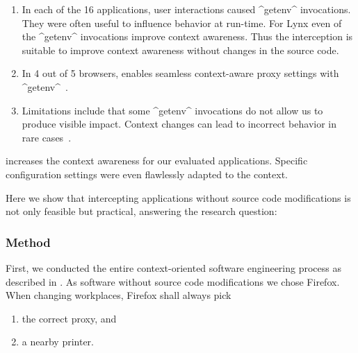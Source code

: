 \begin{finding}
\fixtheorem
\begin{enumerate}
\item In each of the 16 applications, user interactions caused ^getenv^ invocations.
They were often useful to influence behavior at run-time.
For Lynx even  of the ^getenv^ invocations improve context awareness.
Thus the interception is suitable to improve context awareness without changes in the source code.
\item In 4 out of 5 browsers, \elektra{} enables seamless context-aware proxy settings with ^getenv^~\cite{raab2017introducing}.


\item
Limitations include that some ^getenv^ invocations do not allow us to produce visible impact.
Context changes can lead to incorrect behavior in rare cases~\cite{raab2016unanticipated}.
\end{enumerate}

\begin{implication}
\elektra{} increases the context awareness for our evaluated applications.
Specific configuration settings were even flawlessly adapted to the context.
\end{implication}
\end{finding}



















Here we show that intercepting applications without source code modifications is not only feasible but practical, answering the research question:
\rqUnmodifiedPractical*

\subsubsection{Method}

First, we conducted the entire context-oriented software engineering process as described in .
As software without source code modifications we chose Firefox.
When changing workplaces, Firefox shall always pick~\cite{raab2017introducing}
\begin{enumerate}
\item the correct proxy, and
\item a nearby printer.
\end{enumerate}

